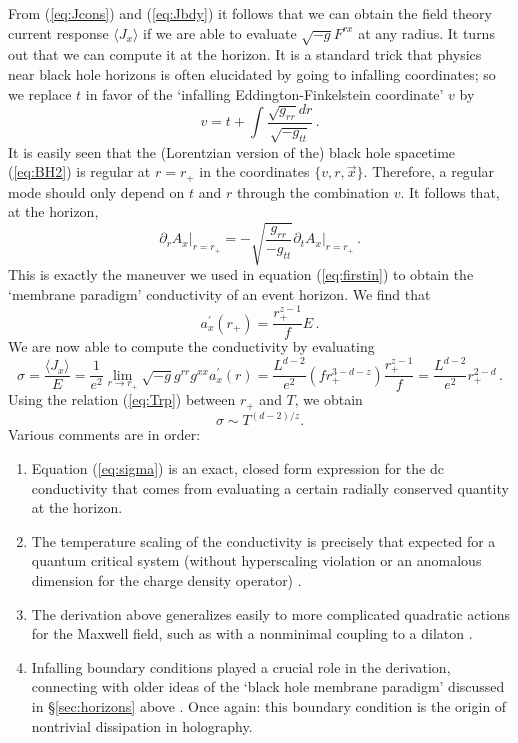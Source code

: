 \documentclass[10pt, oneside]{book}
\let\pa=\partial
\def\be{\begin{equation}}
\def\ee{\end{equation}}
\begin{document}
\begin{doublespace}
From (\ref{eq:Jcons}) and (\ref{eq:Jbdy}) it follows that we can obtain the field theory current response $\langle J_x \rangle$ if we are able to evaluate $\sqrt{-g} F^{rx}$ at any radius. It turns out that we can compute it at the horizon. It is a standard trick that physics near black hole horizons is often elucidated by going to infalling coordinates;  so we replace $t$ in favor of the `infalling Eddington-Finkelstein coordinate' $v$ by
\be
v = t + \int \frac{\sqrt{g_{rr}} dr}{\sqrt{-g_{tt}}}\,.
\ee
It is easily seen that the (Lorentzian version of the) black hole spacetime (\ref{eq:BH2}) is regular at $r=r_+$ in the coordinates $\{v,r,\vec x\}$. Therefore, a regular mode should only depend on $t$ and $r$ through the combination $v$. It follows that, at the horizon,
\be\label{eq:EF}
\pa_r A_x\Big|_{r=r_+} =-  \sqrt{\frac{g_{rr}}{-g_{tt}}} \pa_t A_x\Big|_{r=r_+} \,.
\ee
This is exactly the maneuver we used in equation (\ref{eq:firstin}) to obtain the `membrane paradigm' conductivity of an event horizon.   We find that 
\be
a_x^\prime(r_+) =  \frac{r_+^{z-1}}{f} E \,. \label{eq:JHor}
\ee
We are now able to compute the conductivity by evaluating 
\be\label{eq:sigma}
\sigma = \frac{\langle J_x\rangle}{E} = \frac{1}{e^2} \lim_{r\rightarrow r_+} \sqrt{-g}g^{rr}g^{xx} a_x^\prime(r) = \frac{L^{d-2}}{e^2}\left(f r_+^{3-d-z}\right) \frac{r_+^{z-1}}{f} = \frac{L^{d-2}}{e^2} r_+^{2-d}  \,.
\ee
Using the relation (\ref{eq:Trp}) between $r_+$ and $T$, we obtain \begin{equation}
\sigma \sim T^{(d-2)/z}.
\end{equation}
Various comments are in order:
\begin{enumerate}
\item Equation (\ref{eq:sigma}) is an exact, closed form expression for the dc conductivity that comes from evaluating a certain radially conserved quantity at the horizon.
\item The temperature scaling of the conductivity is precisely that expected for a quantum critical system (without hyperscaling violation or an anomalous dimension for the charge density operator) \cite{PhysRevB.56.8714}.
\item The derivation above generalizes easily to more complicated quadratic actions for the Maxwell field, such as with a nonminimal coupling to a dilaton \cite{Iqbal:2008by}.
\item Infalling boundary conditions played a crucial role in the derivation, connecting with older ideas of the `black hole membrane paradigm' discussed in \S\ref{sec:horizons} above \cite{Kovtun:2003wp, Iqbal:2008by}. Once again: this boundary condition is the origin of nontrivial dissipation in holography.
\end{enumerate}


\end{doublespace}
\end{document}
